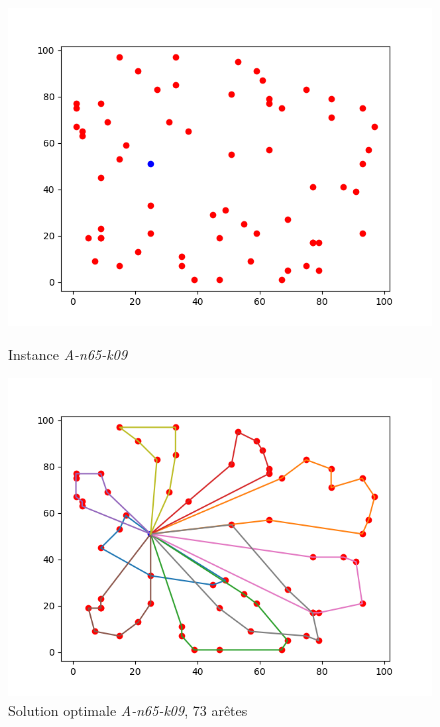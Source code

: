\documentclass[a4paper,11pt]{article}%
\begin{document}
\begin{figure}
    \begin{minipage}[c]{.46\linewidth}
        \centering
        \includegraphics[scale=0.4]{Instance6509}
        
        \caption{Instance \emph{A-n65-k09}}
        \label{A6509}
    \end{minipage}
    \hfill%
    \begin{minipage}[c]{.46\linewidth}
        \centering
        \includegraphics[scale=0.4]{Solution6509}
        
        \caption{Solution optimale \emph{A-n65-k09}, 73 arêtes}
        \label{SolA6509}
    \end{minipage}    
    

\end{figure}
\end{document}
